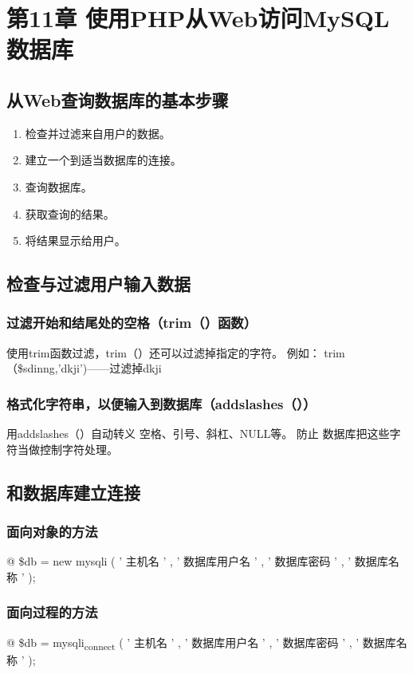 \documentclass[11pt]{article}
\begin{document}
\section{第11章 使用PHP从Web访问MySQL数据库}
\label{sec:org4f1a02b}
\subsection{从Web查询数据库的基本步骤}
\label{sec:org01749c7}
\begin{enumerate}
\item 检查并过滤来自用户的数据。
\item 建立一个到适当数据库的连接。
\item 查询数据库。
\item 获取查询的结果。
\item 将结果显示给用户。
\end{enumerate}
\subsection{检查与过滤用户输入数据}
\label{sec:org307bf66}
\subsubsection{过滤开始和结尾处的空格（trim（）函数）}
\label{sec:org7443eb3}
使用trim函数过滤，trim（）还可以过滤掉指定的字符。
例如：
trim（\$sdinng,'dkji')——过滤掉dkji
\subsubsection{格式化字符串，以便输入到数据库（addslashes（））}
\label{sec:org7a2ca14}
用addslashes（）自动转义 空格、引号、斜杠、NULL等。 防止  数据库把这些字符当做控制字符处理。
\subsection{和数据库建立连接}
\label{sec:org58bf120}
\subsubsection{面向对象的方法}
\label{sec:org4b90321}
@ \$db = new mysqli ( ' 主机名 ' ,   ' 数据库用户名 ' ,   ' 数据库密码
' ,   ' 数据库名称 ' );
\subsubsection{面向过程的方法}
\label{sec:org249abcc}
@ \$db = mysqli\textsubscript{connect}  ( ' 主机名 ' ,   ' 数据库用户名 ' ,   ' 数据库密码
 ' ,   ' 数据库名称 ' );
\end{document}
